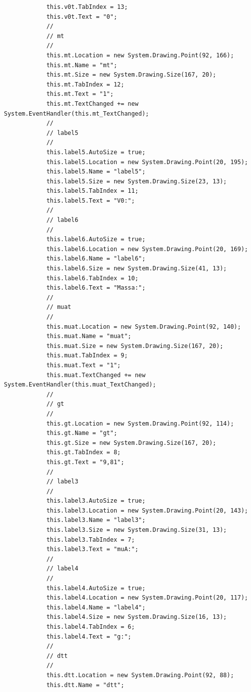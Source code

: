 \documentclass[11pt]{article} %
\begin{document}
\begin{lstlisting}
            this.v0t.TabIndex = 13;
            this.v0t.Text = "0";
            // 
            // mt
            // 
            this.mt.Location = new System.Drawing.Point(92, 166);
            this.mt.Name = "mt";
            this.mt.Size = new System.Drawing.Size(167, 20);
            this.mt.TabIndex = 12;
            this.mt.Text = "1";
            this.mt.TextChanged += new System.EventHandler(this.mt_TextChanged);
            // 
            // label5
            // 
            this.label5.AutoSize = true;
            this.label5.Location = new System.Drawing.Point(20, 195);
            this.label5.Name = "label5";
            this.label5.Size = new System.Drawing.Size(23, 13);
            this.label5.TabIndex = 11;
            this.label5.Text = "V0:";
            // 
            // label6
            // 
            this.label6.AutoSize = true;
            this.label6.Location = new System.Drawing.Point(20, 169);
            this.label6.Name = "label6";
            this.label6.Size = new System.Drawing.Size(41, 13);
            this.label6.TabIndex = 10;
            this.label6.Text = "Massa:";
            // 
            // muat
            // 
            this.muat.Location = new System.Drawing.Point(92, 140);
            this.muat.Name = "muat";
            this.muat.Size = new System.Drawing.Size(167, 20);
            this.muat.TabIndex = 9;
            this.muat.Text = "1";
            this.muat.TextChanged += new System.EventHandler(this.muat_TextChanged);
            // 
            // gt
            // 
            this.gt.Location = new System.Drawing.Point(92, 114);
            this.gt.Name = "gt";
            this.gt.Size = new System.Drawing.Size(167, 20);
            this.gt.TabIndex = 8;
            this.gt.Text = "9,81";
            // 
            // label3
            // 
            this.label3.AutoSize = true;
            this.label3.Location = new System.Drawing.Point(20, 143);
            this.label3.Name = "label3";
            this.label3.Size = new System.Drawing.Size(31, 13);
            this.label3.TabIndex = 7;
            this.label3.Text = "muA:";
            // 
            // label4
            // 
            this.label4.AutoSize = true;
            this.label4.Location = new System.Drawing.Point(20, 117);
            this.label4.Name = "label4";
            this.label4.Size = new System.Drawing.Size(16, 13);
            this.label4.TabIndex = 6;
            this.label4.Text = "g:";
            // 
            // dtt
            // 
            this.dtt.Location = new System.Drawing.Point(92, 88);
            this.dtt.Name = "dtt";

\end{lstlisting}
\end{document}

